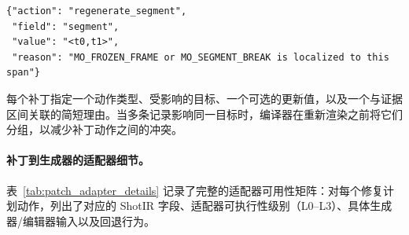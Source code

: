 \documentclass{article}
\begin{document}
\begin{verbatim}
{"action": "regenerate_segment",
 "field": "segment",
 "value": "<t0,t1>",
 "reason": "MO_FROZEN_FRAME or MO_SEGMENT_BREAK is localized to this span"}
\end{verbatim}

每个补丁指定一个动作类型、受影响的目标、一个可选的更新值，以及一个与证据区间关联的简短理由。当多条记录影响同一目标时，编译器在重新渲染之前将它们分组，以减少补丁动作之间的冲突。

\begin{table}[t]
\centering\scriptsize
\caption{补丁到生成器的适配器细节。只有当修复计划可以在无需手动重写的情况下自动翻译为目标生成器或编辑器输入时，才计为适配器可执行。L0/L1 行表示放弃声明或提示重写指令，而非可执行补丁。}
\paragraph{补丁到生成器的适配器细节。}
表~\ref{tab:patch_adapter_details} 记录了完整的适配器可用性矩阵：对每个修复计划动作，列出了对应的 ShotIR 字段、适配器可执行性级别（L0--L3）、具体生成器/编辑器输入以及回退行为。


\end{table}
\end{document}
